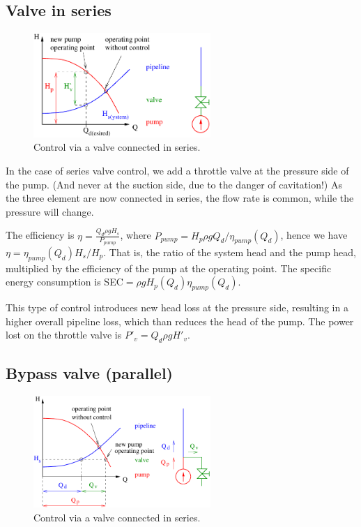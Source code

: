 \clearpage

\subsection{Valve in series}


\begin{figure}
\includegraphics[width=0.6\textwidth]{figs/series_connection.pdf}
\caption{Control via a valve connected in series.}
\end{figure}

In the case of series valve control, we add a throttle valve at the pressure side of the pump. (And never at the suction side, due to the danger of cavitation!) As the three element are now connected in series, the flow rate is common, while the pressure will change. 

The efficiency is $\eta=\frac{Q_d \rho g H_s}{P_{pump}}$, where $P_{pump}=H_p\rho g Q_d/\eta_{pump}(Q_d)$, hence we have $\eta=\eta_{pump}(Q_d)H_s/H_p$. That is, the ratio of the system head and the pump head, multiplied by the efficiency of the pump at the operating point. The specific energy consumption is SEC$=\rho g H_p(Q_d)\eta_{pump}(Q_d)$. 

This type of control introduces new head loss at the pressure side, resulting in a higher overall pipeline loss, which than reduces the head of the pump. The power lost on the throttle valve is $P'_v=Q_d \rho g H'_v$.

\subsection{Bypass valve (parallel)}


\begin{figure}
\includegraphics[width=0.6\textwidth]{figs/parallel_connection.pdf}
\caption{Control via a valve connected in series.}
\end{figure}

